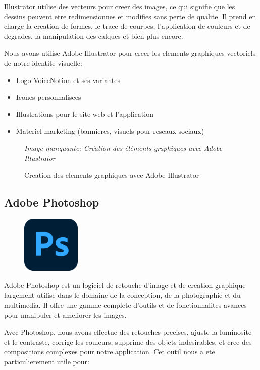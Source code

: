 Illustrator utilise des vecteurs pour creer des images, ce qui signifie que les dessins peuvent etre redimensionnes et modifies sans perte de qualite. Il prend en charge la creation de formes, le trace de courbes, l'application de couleurs et de degrades, la manipulation des calques et bien plus encore.

Nous avons utilise Adobe Illustrator pour creer les elements graphiques vectoriels de notre identite visuelle:

\begin{itemize}
    \item Logo VoiceNotion et ses variantes
    \item Icones personnalisees
    \item Illustrations pour le site web et l'application
    \item Materiel marketing (bannieres, visuels pour reseaux sociaux)
\end{itemize}

\begin{figure}[H]
\centering
\textit{Image manquante: Création des éléments graphiques avec Adobe Illustrator}
\caption{Creation des elements graphiques avec Adobe Illustrator}
\label{fig:illustrator-assets}
\end{figure}

\subsection{Adobe Photoshop}
\begin{figure}
    \centering
    \includegraphics[width=0.25\textwidth]{assets/docs/photoshop.png}
\end{figure}
Adobe Photoshop est un logiciel de retouche d'image et de creation graphique largement utilise dans le domaine de la conception, de la photographie et du multimedia. Il offre une gamme complete d'outils et de fonctionnalites avances pour manipuler et ameliorer les images.

Avec Photoshop, nous avons effectue des retouches precises, ajuste la luminosite et le contraste, corrige les couleurs, supprime des objets indesirables, et cree des compositions complexes pour notre application. Cet outil nous a ete particulierement utile pour:

